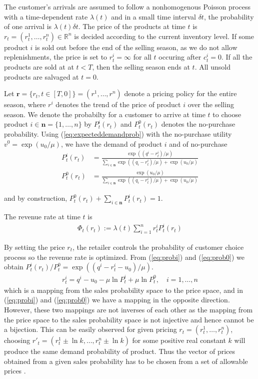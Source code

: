 The customer's arrivals are assumed to follow a nonhomogenous Poisson process with a time-dependent rate $\lambda(t)$ and in a small time interval $\delta t$, the probability of one arrival is $\lambda(t)\delta t$. The price of the products at time $t$ is $r_t = (r_t^1,\ldots,r_t^n) \in \mathbb{R}^n$ is decided according to the current inventory level. If some product $i$ is sold out before the end of the selling season, as we do not allow replenishments, the price is set to $r^i_t = \infty$ for all $t$ occuring after $c^i_t=0$. If all the products are sold at at $t < T$, then the selling season ends at $t$. All unsold products are salvaged at $t=0$. 


Let $\mathbf{r}=\{r_t, t \in [T,0]\} = (r^1, \ldots, r^n)$ denote a pricing policy for the entire season, where $r^i$ denotes the trend of the price of product $i$ over the selling season. We denote the probabilty for a customer to arrive at time $t$ to choose product $i \in \mathbf{n} = \{1,\ldots, n\}$ by $P_t^i(r_t)$ and $P_t^0(r_t)$ denotes the no-purchase probability. Using (\ref{eq:expecteddemandprob}) with the no-purchase utility $v^0 = \exp (u_0/\mu)$, we have the demand of product $i$ and of no-purchase
\begin{align}
P_t^i(r_t) &= \frac{\exp((q^i-r^i_t)/\mu)}{\sum_{i \in \mathbf{n}}\exp((q_i-r^i_t)/\mu)+\exp(u_0/\mu)} \label{eq:probi}\\
P_t^0(r_t)&= \frac{\exp(u_0/\mu)}{\sum_{i \in \mathbf{n}}\exp((q_i-r^i_t)/\mu)+\exp(u_0/\mu)}\label{eq:prob0}
\end{align}

and by construction, $P_t^0(r_t) + \sum_{i \in \mathbf{n}}P_t^i(r_t) = 1$.

The revenue rate at time $t$ is 
\begin{align}
\Phi_t(r_t):=\lambda(t) \sum_{i=1}^{n}r_t^iP_t^i(r_t) \label{eq:revenuerate_reward}
\end{align}

By setting the price $r_t$, the retailer controls the probability of customer choice process so the revenue rate is optimized. From (\ref{eq:probi}) and (\ref{eq:prob0}) we obtain $P_t^i(r_t)/P_t^0=\exp ((q^i-r_t^i-u_0)/\mu)$.
\begin{align}
r_t^i=q^i-u_0-\mu \ln P_t^i + \mu \ln P_t^0, \quad i=1,\ldots, n \label{eq:pricetoprob}
\end{align}
which is a mapping from the sales probability space to the price space, and in (\ref{eq:probi}) and (\ref{eq:prob0}) we have a mapping in the opposite direction. However, these two mappings are not inverses of each other as the mapping from the price space to the sales probability space is not injective and hence cannot be a bijection. This can be easily observed for given pricing $r_t = (r_t^1,\ldots,r_t^n)$, choosing $r'_t = (r_t^1\pm\ln k,\ldots,r_t^n\pm \ln k)$ for some positive real constant $k$ will produce the same demand probability of product. Thus the vector of prices obtained from a given sales probability has to be chosen from a set of allowable prices  \cite{Gallego1997}.


